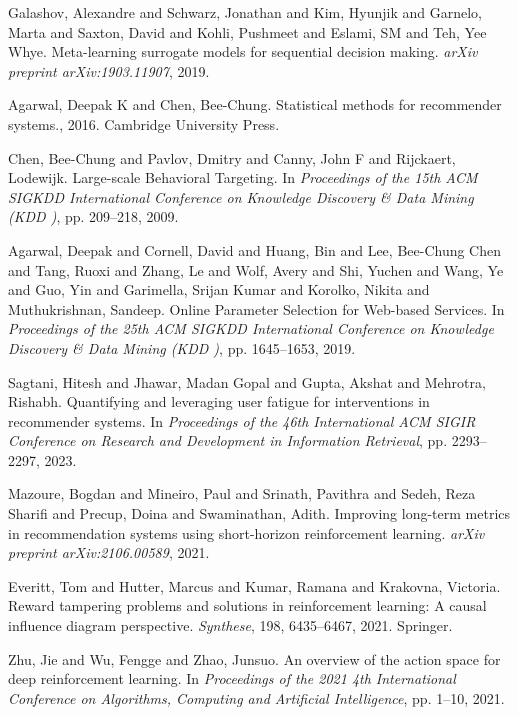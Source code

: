 \begin{thebibliography}{99}
 Galashov, Alexandre and Schwarz, Jonathan and Kim, Hyunjik and Garnelo, Marta and Saxton, David and Kohli, Pushmeet and Eslami, SM and Teh, Yee Whye. {M}eta-learning surrogate models for sequential decision making. \textit{arXiv preprint arXiv:1903.11907}, 2019.

 Agarwal, Deepak K and Chen, Bee-Chung. {S}tatistical methods for recommender systems., 2016. Cambridge University Press.

 Chen, Bee-Chung and Pavlov, Dmitry and Canny, John F and Rijckaert, Lodewijk. {L}arge-scale {B}ehavioral {T}argeting. In \textit{Proceedings of the 15th ACM SIGKDD International Conference on Knowledge Discovery \& Data Mining (KDD )}, pp. 209--218, 2009.

 Agarwal, Deepak and Cornell, David and Huang, Bin and Lee, Bee-Chung Chen and Tang, Ruoxi and Zhang, Le and Wolf, Avery and Shi, Yuchen and Wang, Ye and Guo, Yin and Garimella, Srijan Kumar and Korolko, Nikita and Muthukrishnan, Sandeep. {O}nline {P}arameter {S}election for {W}eb-based {S}ervices. In \textit{Proceedings of the 25th ACM SIGKDD International Conference on Knowledge Discovery \& Data Mining (KDD )}, pp. 1645--1653, 2019.

 Sagtani, Hitesh and Jhawar, Madan Gopal and Gupta, Akshat and Mehrotra, Rishabh. {Q}uantifying and leveraging user fatigue for interventions in recommender systems. In \textit{Proceedings of the 46th International ACM SIGIR Conference on Research and Development in Information Retrieval}, pp. 2293--2297, 2023.

 Mazoure, Bogdan and Mineiro, Paul and Srinath, Pavithra and Sedeh, Reza Sharifi and Precup, Doina and Swaminathan, Adith. {I}mproving long-term metrics in recommendation systems using short-horizon reinforcement learning. \textit{arXiv preprint arXiv:2106.00589}, 2021.

 Everitt, Tom and Hutter, Marcus and Kumar, Ramana and Krakovna, Victoria. {R}eward tampering problems and solutions in reinforcement learning: {A} causal influence diagram perspective. \textit{Synthese}, 198, 6435--6467, 2021. Springer.

 Zhu, Jie and Wu, Fengge and Zhao, Junsuo. {A}n overview of the action space for deep reinforcement learning. In \textit{Proceedings of the 2021 4th International Conference on Algorithms, Computing and Artificial Intelligence}, pp. 1--10, 2021.


\end{thebibliography}
